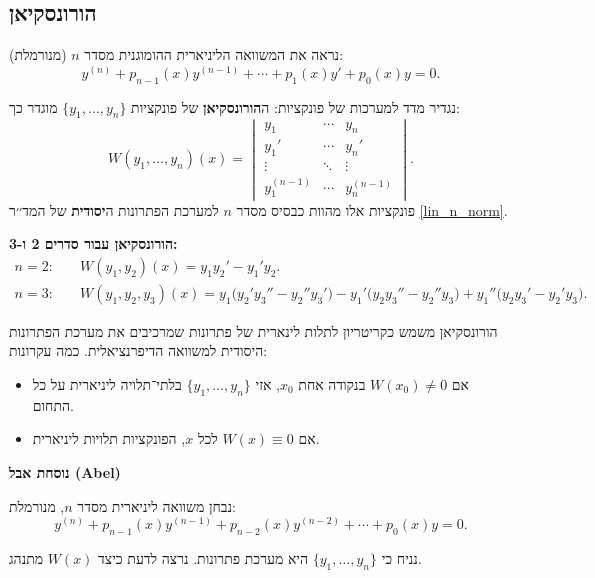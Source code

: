 \documentclass{article}
\numberwithin{equation}{section}
\begin{document}
\newpage
\subsection{הורונסקיאן }

נראה את המשוואה הליניארית ההומוגנית מסדר $n$ (מנורמלת):
\begin{equation}\label{lin_n_norm}
y^{(n)} + p_{n-1}(x)y^{(n-1)} + \cdots + p_1(x)y' + p_0(x)y = 0.
\end{equation}

נגדיר מדד למערכות של פונקציות:  
ה\textbf{הורונסקיאן} של פונקציות $\{y_1,\dots,y_n\}$ מוגדר כך:
\begin{equation}
W(y_1,\dots,y_n)(x) =
\begin{vmatrix}
y_1 & \cdots & y_n \\
y_1' & \cdots & y_n' \\
\vdots & \ddots & \vdots \\
y_1^{(n-1)} & \cdots & y_n^{(n-1)}
\end{vmatrix}.
\end{equation}
פונקציות אלו מהוות כבסיס מסדר $n$ למערכת הפתרונות ה\textbf{יסודית} של המד׳׳ר \ref{lin_n_norm}.

\textbf{הורונסקיאן עבור סדרים 2 ו-3:}
\begin{align*}
n=2: \quad 
&W(y_1,y_2)(x) = y_1 y_2' - y_1' y_2. \\[6pt]
n=3: \quad 
&W(y_1,y_2,y_3)(x) =
y_1 \big(y_2' y_3'' - y_2'' y_3'\big)
- y_1' \big(y_2 y_3'' - y_2'' y_3\big)
+ y_1'' \big(y_2 y_3' - y_2' y_3\big).
\end{align*}

הורונסקיאן משמש כקריטריון לתלות לינארית של פתרונות שמרכיבים את מערכת הפתרונות היסודית למשוואה הדיפרנציאלית. כמה עקרונות:
\begin{itemize}
  \item אם $W(x_0)\neq 0$ בנקודה אחת $x_0$, אזי $\{y_1,\dots,y_n\}$ בלתי־תלויה ליניארית על כל התחום.
  \item אם $W(x)\equiv 0$ לכל $x$, הפונקציות תלויות ליניארית.
\end{itemize}

\textbf{נוסחת אבל (Abel)}  

נבחן משוואה ליניארית מסדר $n$, מנורמלת:
\begin{equation}
y^{(n)} + p_{n-1}(x) y^{(n-1)} + p_{n-2}(x) y^{(n-2)} + \cdots + p_0(x) y = 0.
\end{equation}

נניח כי $\{y_1,\dots,y_n\}$ היא מערכת פתרונות. נרצה לדעת כיצד $W(x)$ מתנהג.  
\end{document}
